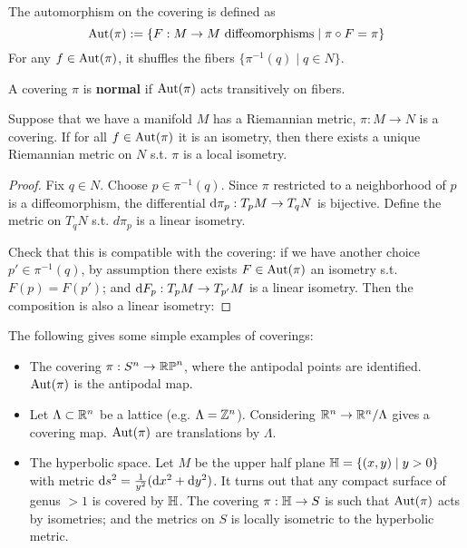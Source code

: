 \documentclass{article}
\begin{document}
\begin{definition}
    The automorphism on the covering is defined as
    \[
        \mathrm{Aut}(\pi) := \{ F: M \to M \text{ diffeomorphisms} \mid \pi \circ F = \pi \}
    \]
    For any $f \in \mathrm{Aut}(\pi)$, it shuffles the fibers $\{ \pi^{-1}(q) \mid q \in N \}$.
\end{definition}

\begin{definition}
    A covering $\pi$ is \textbf{normal} if $\mathrm{Aut}(\pi)$ acts transitively on fibers. 
\end{definition}

\begin{proposition}
    Suppose that we have a manifold $M$ has a Riemannian metric, $\pi: M \to N$ is a covering. If for all $f \in \mathrm{Aut}(\pi)$ it is an isometry, then there exists a unique Riemannian metric on $N$ s.t. $\pi$ is a local isometry.
\end{proposition}

\begin{proof}
    Fix $q \in N$. Choose $p \in \pi^{-1}(q)$. Since $\pi$ restricted to a neighborhood of $p$ is a diffeomorphism, the differential $\mathrm{d} \pi_p: T_p M \to T_q N$ is bijective. Define the metric on $T_qN$ s.t. $d \pi_p$ is a linear isometry. 
    
    Check that this is compatible with the covering: if we have another choice $p' \in \pi^{-1} (q)$, by assumption there exists $F \in \mathrm{Aut}(\pi)$ an isometry s.t. $F(p) = F(p')$; and $\mathrm{d} F_p: T_p M \to T_{p'} M$ is a linear isometry. Then the composition is also a linear isometry:

    \begin{minipage}{\linewidth}
        \centering
    \end{minipage}
\end{proof}

\begin{example}
    The following gives some simple examples of coverings:
    \begin{itemize}
        \item The covering $\pi: S^n \to \mathbb{RP}^n$, where the antipodal points are identified. $\mathrm{Aut}(\pi)$ is the antipodal map.
        \item Let $\Lambda \subset \mathbb{R}^n$ be a lattice (e.g. $\Lambda = \mathbb{Z}^n$). Considering $\mathbb{R}^n \to \mathbb{R}^n /\Lambda$ gives a covering map. $\mathrm{Aut}(\pi)$ are translations by $\Lambda$.
        \item The hyperbolic space. Let $M$ be the upper half plane $\mathbb{H} = \{ (x, y) \mid y > 0 \}$ with metric $\mathrm{d} s^2 = \frac{1}{y^2} (\mathrm{d} x^2 + \mathrm{d} y^2)$. It turns out that any compact surface of genus $> 1$ is covered by $\mathbb{H}$. The covering $\pi: \mathbb{H} \to S$ is such that $\mathrm{Aut}(\pi)$ acts by isometries; and the metrics on $S$ is locally isometric to the hyperbolic metric.
    \end{itemize}
\end{example}
\end{document}
